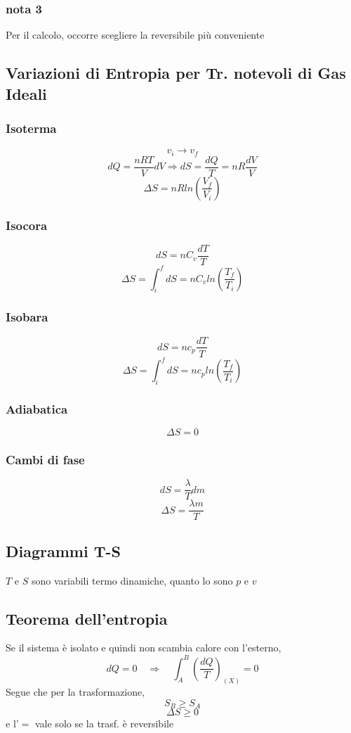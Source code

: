 \documentclass[a4paper]{report}
\begin{document}
  \subsubsection{nota 3}
  Per il calcolo, occorre scegliere la reversibile più conveniente
  \subsection{Variazioni di Entropia per Tr. notevoli di Gas Ideali}
  \subsubsection{Isoterma}
  $$ v_i \rightarrow v_f$$
  $$ dQ = \frac{nRT}{V} dV \Rightarrow dS = \frac{dQ}{T} = nR\frac{dV}{V} $$
  $$ \Delta S = nR ln(\frac{V_f}{V_i}) $$

  \subsubsection{Isocora}
  $$ dS = nC_v\frac{dT}{T} $$
  $$ \Delta S = \int_i^f dS = nC_v ln(\frac{T_f}{T_i}) $$

  \subsubsection{Isobara}
  $$ dS = nc_p\frac{dT}{T} $$
  $$ \Delta S = \int_i^f dS = n c_p ln(\frac{T_f}{T_i})$$

  \subsubsection{Adiabatica}
  $$ \Delta S = 0 $$

  \subsubsection{Cambi di fase}
  $$ dS = \frac{\lambda}{T} dm$$
  $$ \Delta S = \frac{\lambda m}{T} $$

  \subsection{Diagrammi T-S}
  $T$ e $S$ sono variabili termo dinamiche, quanto lo sono $p$ e $v$

  \subsection{Teorema dell'entropia}
  Se il sistema è isolato e quindi non scambia calore con l'esterno,
  $$ dQ = 0 \quad \Rightarrow \quad \int_A^B(\frac{dQ}{T})_{(X)} = 0$$
  Segue che per la trasformazione,
  $$ S_B \geq S_A $$
  $$ \Delta S \geq 0 $$
  e l'$=$ vale solo se la trasf. è reversibile
\end{document}
